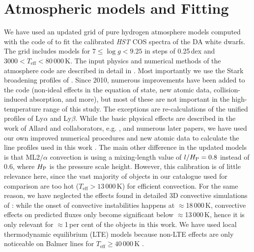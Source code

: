 \documentclass[fleqn,usenatbib, useAMS]{mnras}
\newcommand{\Teff}{\mbox{$T_{\mathrm{eff}}$}}
\begin{document}
\section{Atmospheric models and Fitting}\label{sec:fit}
We have used an updated grid of pure hydrogen atmosphere models computed with the code of \cite{Koester2010} to fit the calibrated \textit{HST} COS spectra of the DA white dwarfs. The grid includes models for $7 \leq\log g < 9.25$ in steps of 0.25\,dex and $3000 < \Teff < 80\,000$\,K. The input physics and numerical methods of the atmosphere code  are described in detail in \cite{Koester2010}. Most importantly we use the Stark broadening profiles of \citet[TB09, hereafter]{Tremblay2009}. Since 2010, numerous improvements have been added to the code (non-ideal effects in the equation of state, new atomic data, collision-induced absorption, and more), but most of these are not important in the high-temperature range of this study. The exceptions are re-calculations of the unified profiles of Ly$\alpha$ and Ly$\beta$. While the basic physical effects are described in the work of Allard and collaborators, e.g. \cite{1994Allard, Allard1999}, and numerous later papers, we have used our own improved numerical procedures and new atomic data to calculate the line profiles used in this work \citep{Santos2012, Hollands2017}. The main other difference in the updated models is that ML2$/\alpha$ convection is using a mixing-length value of $l/H_{\rm P} = 0.8$ instead of 0.6, where $H_{\rm P}$ is the pressure scale height. However, this calibration is of little relevance here, since the vast majority of objects in our catalogue used for comparison are too hot ($\Teff >13\,000$\,K) for efficient convection. For the same reason, we have neglected the effects found in detailed 3D convective simulations of \citet{Tremblay2013}: while the onset of convective instabilities happens at $\approx$18\,000\,K, convective effects on predicted fluxes only become significant below $\approx$13\,000\,K, hence it is only relevant for $\approx$1\,per cent of the objects in this work. We have used local thermodynamic equilibrium (LTE) models because non-LTE effects are only noticeable on Balmer lines for $\Teff\geq40\,000$\,K \citep{Tremblay2011}.
\end{document}
